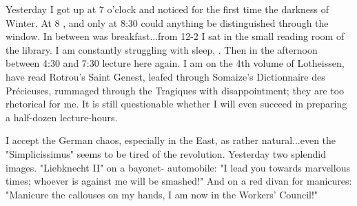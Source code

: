 
Yesterday I got up at 7 o'clock and noticed for the first time the darkness of Winter. At 8 , and only at 8:30 could anything be distinguished through the window. In between was breakfast...from 12-2 I sat in the small reading room of the library. I am constantly struggling with sleep, . Then in the afternoon between 4:30 and 7:30 lecture here again. I am on the 4th volume of Lotheissen, have read Rotrou's Saint Genest, leafed through Somaize's Dictionnaire des Précieuses, rummaged through the Tragiques with disappointment; they are too rhetorical for me. It is still questionable whether I will even succeed in preparing a half-dozen lecture-hours.

\missing

I accept the German chaos, especially in the East, as rather natural...even the "Simplicissimus" seems to be tired of the revolution. Yesterday two splendid images. "Liebknecht II" on a bayonet- automobile: "I lead you towards marvellous times; whoever is against me will be smashed!" And  on a red divan for manicures: "Manicure the callouses on my hands, I am now in the Workers' Council!"

